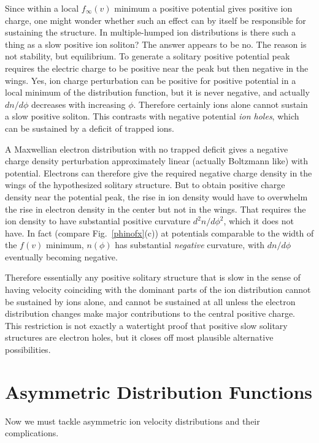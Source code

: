 \documentclass[12pt]{article}
\begin{document}
Since within a local $f_\infty(v)$ minimum a positive potential gives
positive ion charge, one might wonder whether such an effect can by
itself be responsible for sustaining the structure. In multiple-humped
ion distributions is there such a thing as a slow positive ion
soliton?  The answer appears to be no. The reason is not stability,
but equilibrium. To generate a solitary positive potential peak
requires the electric charge to be positive near the peak but then
negative in the wings. Yes, ion charge perturbation can be positive for
positive potential in a local minimum of the distribution function,
but it is never negative, and actually $dn/d\phi$ decreases with
increasing $\phi$. Therefore certainly ions alone cannot sustain a
slow positive soliton. This contrasts with negative potential
\emph{ion holes}, which can be sustained by a deficit of trapped ions.

A Maxwellian electron distribution with no trapped deficit gives a
negative charge density perturbation approximately linear (actually
Boltzmann like) with potential.  Electrons can therefore give the
required negative charge density in the wings of the hypothesized
solitary structure. But to obtain positive charge density near the
potential peak, the rise in ion density would have to overwhelm the
rise in electron density in the center but not in the wings. That
requires the ion density to have substantial positive curvature
$d^2n/d\phi^2$, which it does not have. In fact (compare Fig.\ \ref{phinofx}(c))
at potentials comparable to the width of the $f(v)$ minimum, $n(\phi)$
has substantial \emph{negative} curvature, with $dn/d\phi$ eventually
becoming negative.

Therefore essentially any positive solitary structure that is slow in
the sense of having velocity coinciding with the dominant parts of the
ion distribution cannot be sustained by ions alone, and cannot be
sustained at all unless the electron distribution changes make major
contributions to the central positive charge. This restriction is not
exactly a watertight proof that positive slow solitary structures are
electron holes, but it closes off most plausible alternative possibilities.


\section{Asymmetric Distribution Functions}\label{sec2}

Now we must tackle asymmetric ion velocity distributions and their
complications.
\end{document}
